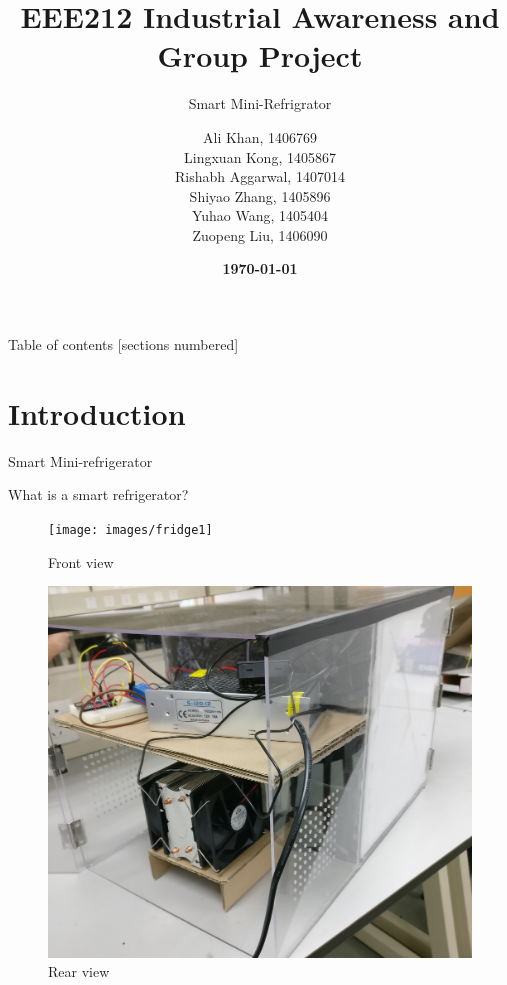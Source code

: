 \documentclass[10pt]{beamer}
\title{EEE212 Industrial Awareness and Group Project}
\subtitle{Smart Mini-Refrigrator}
\date{\bfseries{\today}}
\author{Ali Khan, 1406769\\Lingxuan Kong, 1405867\\Rishabh Aggarwal, 1407014\\Shiyao Zhang, 1405896\\Yuhao Wang, 1405404\\Zuopeng Liu, 1406090}	\institute{\textcolor{red}{\bfseries{Department of Electrical and Electronics Engineering, XJTLU}}}
\begin{document}
\maketitle
{
\begin{frame}{Table of contents}
  [sections numbered]
  \tableofcontents[hideallsubsections]
\end{frame}
}
\section{Introduction}
{
\begin{frame}[fragile]{Smart Mini-refrigerator}
	\begin{center}
		\Huge{What is a smart refrigerator?}
	\begin{figure}
		\begin{minipage}[b]{0.4\linewidth}
			\texttt{[image: images/fridge1]}
			\caption{Front view}
		\end{minipage}
		\begin{minipage}[b]{0.4\linewidth}
			\includegraphics[width = 1.0\linewidth]{images/fridge2}
			\caption{Rear view}
		\end{minipage}
	\end{figure}
	\end{center}
\end{frame}
}
\end{document}
